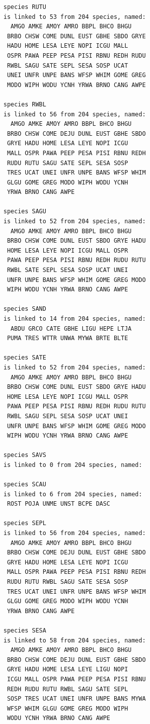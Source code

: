 \documentclass{statsoc}
\begin{document}
\begin{lstlisting}
species RUTU
is linked to 53 from 204 species, named:
  AMGO AMKE AMOY AMRO BBPL BHCO BHGU
 BRBO CHSW COME DUNL EUST GBHE SBDO GRYE
 HADU HOME LESA LEYE NOPI ICGU MALL
 OSPR PAWA PEEP PESA PISI RBNU REDH RUDU
 RWBL SAGU SATE SEPL SESA SOSP UCAT
 UNEI UNFR UNPE BANS WFSP WHIM GOME GREG
 MODO WIPH WODU YCNH YRWA BRNO CANG AWPE

species RWBL
is linked to 56 from 204 species, named:
  AMGO AMKE AMOY AMRO BBPL BHCO BHGU
 BRBO CHSW COME DEJU DUNL EUST GBHE SBDO
 GRYE HADU HOME LESA LEYE NOPI ICGU
 MALL OSPR PAWA PEEP PESA PISI RBNU REDH
 RUDU RUTU SAGU SATE SEPL SESA SOSP
 TRES UCAT UNEI UNFR UNPE BANS WFSP WHIM
 GLGU GOME GREG MODO WIPH WODU YCNH
 YRWA BRNO CANG AWPE

species SAGU
is linked to 52 from 204 species, named:
  AMGO AMKE AMOY AMRO BBPL BHCO BHGU
 BRBO CHSW COME DUNL EUST SBDO GRYE HADU
 HOME LESA LEYE NOPI ICGU MALL OSPR
 PAWA PEEP PESA PISI RBNU REDH RUDU RUTU
 RWBL SATE SEPL SESA SOSP UCAT UNEI
 UNFR UNPE BANS WFSP WHIM GOME GREG MODO
 WIPH WODU YCNH YRWA BRNO CANG AWPE

species SAND
is linked to 14 from 204 species, named:
  ABDU GRCO CATE GBHE LIGU HEPE LTJA
 PUMA TRES WTTR UNWA MYWA BRTE BLTE

species SATE
is linked to 52 from 204 species, named:
  AMGO AMKE AMOY AMRO BBPL BHCO BHGU
 BRBO CHSW COME DUNL EUST SBDO GRYE HADU
 HOME LESA LEYE NOPI ICGU MALL OSPR
 PAWA PEEP PESA PISI RBNU REDH RUDU RUTU
 RWBL SAGU SEPL SESA SOSP UCAT UNEI
 UNFR UNPE BANS WFSP WHIM GOME GREG MODO
 WIPH WODU YCNH YRWA BRNO CANG AWPE

species SAVS
is linked to 0 from 204 species, named:

species SCAU
is linked to 6 from 204 species, named:
 ROST POJA UNME UNST BCPE DASC

species SEPL
is linked to 56 from 204 species, named:
  AMGO AMKE AMOY AMRO BBPL BHCO BHGU
 BRBO CHSW COME DEJU DUNL EUST GBHE SBDO
 GRYE HADU HOME LESA LEYE NOPI ICGU
 MALL OSPR PAWA PEEP PESA PISI RBNU REDH
 RUDU RUTU RWBL SAGU SATE SESA SOSP
 TRES UCAT UNEI UNFR UNPE BANS WFSP WHIM
 GLGU GOME GREG MODO WIPH WODU YCNH
 YRWA BRNO CANG AWPE

species SESA
is linked to 58 from 204 species, named:
  AMGO AMKE AMOY AMRO BBPL BHCO BHGU
 BRBO CHSW COME DEJU DUNL EUST GBHE SBDO
 GRYE HADU HOME LESA LEYE LIGU NOPI
 ICGU MALL OSPR PAWA PEEP PESA PISI RBNU
 REDH RUDU RUTU RWBL SAGU SATE SEPL
 SOSP TRES UCAT UNEI UNFR UNPE BANS MYWA
 WFSP WHIM GLGU GOME GREG MODO WIPH
 WODU YCNH YRWA BRNO CANG AWPE


\end{lstlisting}
\end{document}
